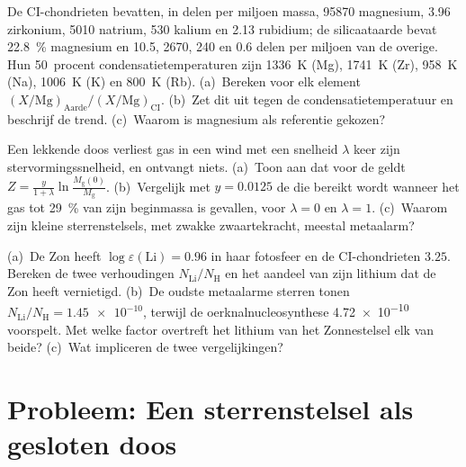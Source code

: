 \begin{exercise}[$\star\star\star$]\label{exo:b3:origin-of-elements:10}
De CI-chondrieten bevatten, in delen per miljoen massa, \num{95870}
magnesium, \num{3.96} zirkonium, \num{5010} natrium, \num{530}
kalium en \num{2.13} rubidium; de silicaataarde bevat
\qty{22.8}{\percent} magnesium en \num{10.5}, \num{2670}, \num{240}
en \num{0.6} delen per miljoen van de overige. Hun 50~procent
condensatietemperaturen zijn \qty{1336}{K} (Mg), \qty{1741}{K} (Zr),
\qty{958}{K} (Na), \qty{1006}{K} (K) en \qty{800}{K} (Rb). (a)~Bereken voor
elk element $(X/\mathrm{Mg})_\mathrm{Aarde}/(X/\mathrm{Mg})_\mathrm{CI}$.
(b)~Zet dit uit tegen de condensatietemperatuur en beschrijf de
trend. (c)~Waarom is magnesium als referentie gekozen?
\end{exercise}

\begin{exercise}[$\star\star\star$]\label{exo:b3:origin-of-elements:11}
Een lekkende doos verliest gas in een wind met een snelheid $\lambda$ keer
zijn stervormingssnelheid, en ontvangt niets. (a)~Toon aan dat voor de  geldt
$Z = \frac{y}{1 + \lambda}\ln\frac{M_\mathrm{g}(0)}{M_\mathrm{g}}$.
(b)~Vergelijk met $y = 0.0125$ de  die bereikt wordt wanneer het gas
tot \qty{29}{\percent} van zijn beginmassa is gevallen, voor $\lambda = 0$ en
$\lambda = 1$. (c)~Waarom zijn kleine sterrenstelsels, met zwakke
zwaartekracht, meestal metaalarm?
\end{exercise}

\begin{exercise}[$\star\star\star$]\label{exo:b3:origin-of-elements:12}
(a)~De Zon heeft $\log\varepsilon(\mathrm{Li}) = 0.96$ in haar fotosfeer
en de CI-chondrieten $3.25$. Bereken de twee verhoudingen $N_\mathrm{Li}/N_\mathrm{H}$
en het aandeel van zijn lithium dat de Zon heeft vernietigd. (b)~De oudste
metaalarme sterren tonen $N_\mathrm{Li}/N_\mathrm{H} = \num{1.45e-10}$,
terwijl de oerknalnucleosynthese \num{4.72e-10} voorspelt. Met welke factor
overtreft het lithium van het Zonnestelsel elk van beide? (c)~Wat impliceren de
twee vergelijkingen?
\end{exercise}

\section{Probleem: Een sterrenstelsel als gesloten doos}

